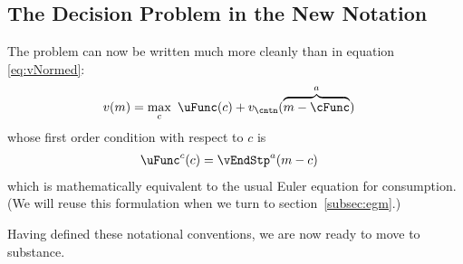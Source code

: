 \documentclass[titlepage, headings=optiontotocandhead]{Resources/texmf-local/tex/latex/econtex}
\begin{document}
\subsection{The Decision Problem in the New Notation}\label{subsec:decision-problem}

The {\Decision} problem can now be written much more cleanly than in equation \eqref{eq:vNormed}:
  \begin{equation}\begin{gathered}\begin{aligned}
        v(m) & = \max_{c}~ \uFunc(c) + v_{\cntn}(\overbrace{m-\cFunc}^{a}) \label{eq:vMid}
      \end{aligned}\end{gathered}\end{equation}
whose first order condition with respect to $c$ is
\begin{equation}\begin{gathered}\begin{aligned}
  \uFunc^{c}(c) &= \vEndStp^{a}(m-c)  \label{eq:upEqbetaOp} 
\end{aligned}\end{gathered}\end{equation}
which is mathematically equivalent to the usual Euler equation for consumption.  (We will reuse this formulation when we turn to section~\ref{subsec:egm}.)

Having defined these notational conventions, we are now ready to move to substance.
\end{document}
